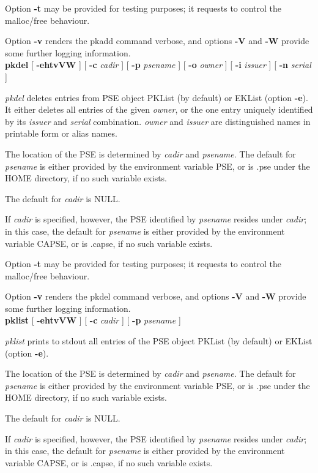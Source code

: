 Option {\bf -t} may be provided for testing purposes; it requests to control the malloc/free behaviour.

Option {\bf -v} renders the pkadd command verbose, and options {\bf -V} and {\bf -W} 
provide some further logging
information.
\\ [1em] 
{\bf pkdel} [ {\bf -ehtvVW} ] [ {\bf -c} {\em cadir} ] [ {\bf -p} {\em psename} ] [ {\bf -o} {\em owner} ] [ {\bf -i} {\em issuer} ] [ 
{\bf -n} {\em serial} ] 

{\em pkdel} deletes entries from PSE object PKList (by default) or EKList (option {\bf -e}). It
either deletes all entries of the given {\em owner}, or the one entry uniquely identified
by its {\em issuer} and {\em serial} combination. {\em owner} and {\em issuer} are distinguished
names in printable form or alias names.
 
The location of the PSE is determined by {\em cadir} and {\em psename}. The default for {\em 
psename} is either provided by the environment variable PSE, or is .pse under the HOME directory, if no such
variable exists.
 
The default for {\em cadir} is NULL. 

If {\em cadir} is specified,
however, the PSE identified by {\em psename} resides under {\em cadir}; in this case, the default
for {\em psename} is either provided by the environment variable CAPSE, or is .capse, if no such variable
exists.
 
Option {\bf -t} may be provided for testing purposes; it requests to control the malloc/free behaviour.

Option {\bf -v} renders the pkdel command verbose, and options {\bf -V} and {\bf -W} 
provide some further logging
information.
\\ [1em] 
{\bf pklist} [ {\bf -ehtvVW} ] [ {\bf -c} {\em cadir} ] [ {\bf -p} {\em psename} ]

{\em pklist} prints to stdout all entries of the PSE object PKList (by default)
or EKList (option {\bf -e}).
 
The location of the PSE is determined by {\em cadir} and {\em psename}. The default for {\em 
psename} is either provided by the environment variable PSE, or is .pse under the HOME directory, if no such
variable exists.
 
The default for {\em cadir} is NULL. 

If {\em cadir} is specified,
however, the PSE identified by {\em psename} resides under {\em cadir}; in this case, the default
for {\em psename} is either provided by the environment variable CAPSE, or is .capse, if no such variable
exists.
 

